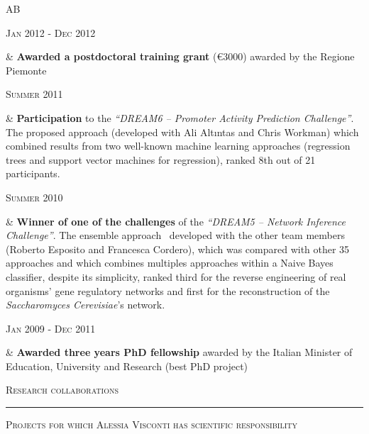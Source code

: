 \documentclass[a4paper,10pt]{article}
\newcommand{\mediumtitle}[1]{
	\vspace{0.2cm}
	{\noindent
	\Large \textsc{#1}\\[-2ex]
	\hrule
	\vspace{0.2cm}}
}
\newcommand{\smalltitle}[1]{
	\vspace{0.1cm}
	{\noindent 
	\large \textsc{#1}}
	\vspace{0.1cm}
}
\newenvironment{doubletablelist}
{
	\vspace{-0.2cm}
	\begin{longtable}[!h]{AB}}{\end{longtable}
}
\newcommand{\dtlist}[2]{
\hspace{-3cm}
\noindent
	\begin{minipage}{0.22\textwidth}
	\begin{flushright}
	\textsc{#1}
	\end{flushright}
	\end{minipage}
	& #2\\[0.2cm]
}
\begin{document}
\begin{doubletablelist}
	\dtlist{Jan 2012 - Dec 2012}{\textbf{Awarded a postdoctoral training grant} (\euro{3000}) awarded by the Regione Piemonte}

	\dtlist{Summer 2011}{\textbf{Participation} to the \emph{``DREAM6 -- Promoter Activity Prediction Challenge''}. The proposed approach (developed with Ali Altıntas and Chris Workman) which combined results from two well-known machine learning approaches (regression trees and support vector machines for regression), ranked 8th out of 21 participants.}

	\dtlist{Summer 2010}{ \textbf{Winner of one of the challenges} of the \emph{``DREAM5 -- Network Inference Challenge''}. The ensemble approach~\cite{Vis11b,Mar12} developed with the other team members (Roberto Esposito and Francesca Cordero), which was compared with other 35 approaches and which combines multiples approaches within a Naive Bayes classifier, despite its simplicity, ranked third for the reverse engineering of real organisms' gene regulatory networks and first for the reconstruction of the \emph{Saccharomyces Cerevisiae}'s network.}

	\dtlist{Jan 2009 - Dec 2011}{\textbf{Awarded three years PhD fellowship} awarded by the Italian Minister of Education, University and Research (best PhD project)}
\end{doubletablelist}





\mediumtitle{Research collaborations}

\vspace{0.2cm}

\smalltitle{Projects for which Alessia Visconti has scientific responsibility}
\end{document}
